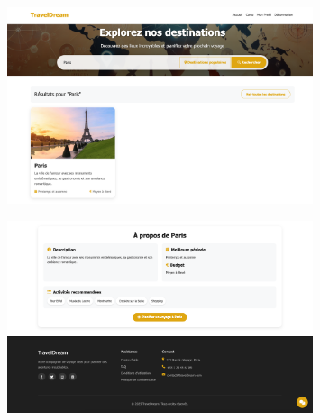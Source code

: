 \documentclass[a4paper,12pt]{article}
\begin{document}
\begin{figure}[H]
    \centering
    \includegraphics[width=0.8\textwidth]{4_accueil_3.png}
\end{figure}
\begin{figure}[H]
    \centering
    \includegraphics[width=0.8\textwidth]{4_accueil_4.png}
\end{figure}
\end{document}
